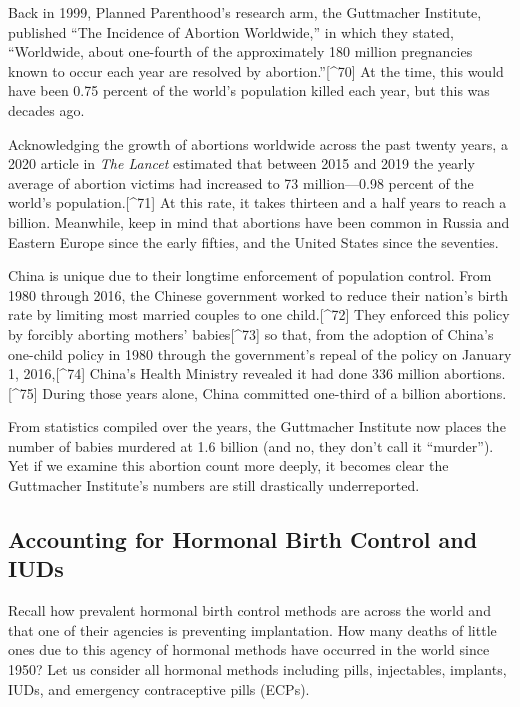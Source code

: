 \documentclass[
]{book}
\begin{document}
Back in 1999, Planned Parenthood's research arm, the Guttmacher Institute, published ``The Incidence of Abortion Worldwide,'' in which they stated, ``Worldwide, about one-fourth of the approximately 180 million pregnancies known to occur each year are resolved by abortion.''{[}\^{}70{]} At the time, this would have been 0.75 percent of the world's population killed each year, but this was decades ago.

Acknowledging the growth of abortions worldwide across the past twenty years, a 2020 article in \emph{The Lancet} estimated that between 2015 and 2019 the yearly average of abortion victims had increased to 73 million---0.98 percent of the world's population.{[}\^{}71{]} At this rate, it takes thirteen and a half years to reach a billion. Meanwhile, keep in mind that abortions have been common in Russia and Eastern Europe since the early fifties, and the United States since the seventies.

China is unique due to their longtime enforcement of population control. From 1980 through 2016, the Chinese government worked to reduce their nation's birth rate by limiting most married couples to one child.{[}\^{}72{]} They enforced this policy by forcibly aborting mothers' babies{[}\^{}73{]} so that, from the adoption of China's one-child policy in 1980 through the government's repeal of the policy on January 1, 2016,{[}\^{}74{]} China's Health Ministry revealed it had done 336 million abortions.{[}\^{}75{]} During those years alone, China committed one-third of a billion abortions.

From statistics compiled over the years, the Guttmacher Institute now places the number of babies murdered at 1.6 billion (and no, they don't call it ``murder''). Yet if we examine this abortion count more deeply, it becomes clear the Guttmacher Institute's numbers are still drastically underreported.

\hypertarget{accounting-for-hormonal-birth-control-and-iuds}{%
\subsection{Accounting for Hormonal Birth Control and IUDs}\label{accounting-for-hormonal-birth-control-and-iuds}}

Recall how prevalent hormonal birth control methods are across the world and that one of their agencies is preventing implantation. How many deaths of little ones due to this agency of hormonal methods have occurred in the world since 1950? Let us consider all hormonal methods including pills, injectables, implants, IUDs, and emergency contraceptive pills (ECPs).
\end{document}
